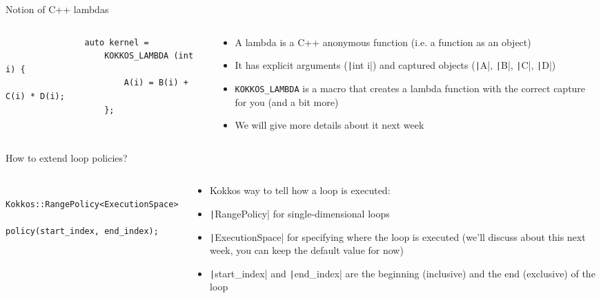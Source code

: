 \documentclass[
    aspectratio=169,
]{beamer}
\begin{document}
\begin{frame}[fragile]{Notion of C++ lambdas}
    \begin{columns}
        \begin{column}{0.5\linewidth}
            \begin{verbatim}
                auto kernel =
                    KOKKOS_LAMBDA (int i) {
                        A(i) = B(i) + C(i) * D(i);
                    };
            \end{verbatim}
        \end{column}
        \begin{column}{0.5\linewidth}
            \begin{itemize}
                \item A lambda is a C++ anonymous function (i.e. a function as an object)
                \item It has explicit arguments (\texttt|int i|) and captured objects (\texttt|A|, \texttt|B|, \texttt|C|, \texttt|D|)
                \item \texttt{KOKKOS\_LAMBDA} is a macro that creates a lambda function with the correct capture for you (and a bit more)
                \item We will give more details about it next week
            \end{itemize}
        \end{column}
    \end{columns}
\end{frame}

\begin{frame}[fragile]{How to extend loop policies?}
    \begin{columns}
        \begin{column}{0.55\linewidth}
            \begin{verbatim}
                Kokkos::RangePolicy<ExecutionSpace>
                    policy(start_index, end_index);
            \end{verbatim}
        \end{column}
        \begin{column}{0.45\linewidth}
            \begin{itemize}
                \item Kokkos way to tell how a loop is executed: 
                \item \texttt|RangePolicy| for single-dimensional loops
                \item \texttt|ExecutionSpace| for specifying where the loop is executed (we'll discuss about this next week, you can keep the default value for now)
                \item \texttt|start_index| and \texttt|end_index| are the beginning (inclusive) and the end (exclusive) of the loop
            \end{itemize}
        \end{column}
    \end{columns}
\end{frame}
\end{document}
